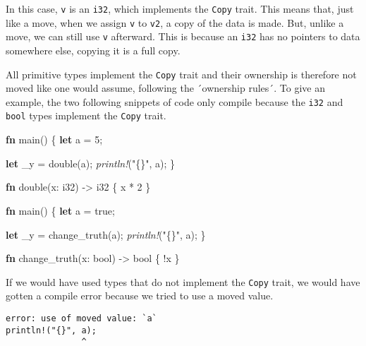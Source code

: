 \documentclass[a4paper,]{book}
\newenvironment{Shaded}{\begin{snugshade}}{\end{snugshade}}
\newcommand{\KeywordTok}[1]{\textcolor[rgb]{0.13,0.29,0.53}{\textbf{{#1}}}}
\newcommand{\DataTypeTok}[1]{\textcolor[rgb]{0.13,0.29,0.53}{{#1}}}
\newcommand{\DecValTok}[1]{\textcolor[rgb]{0.00,0.00,0.81}{{#1}}}
\newcommand{\ConstantTok}[1]{\textcolor[rgb]{0.00,0.00,0.00}{{#1}}}
\newcommand{\StringTok}[1]{\textcolor[rgb]{0.31,0.60,0.02}{{#1}}}
\newcommand{\PreprocessorTok}[1]{\textcolor[rgb]{0.56,0.35,0.01}{\textit{{#1}}}}
\newcommand{\NormalTok}[1]{{#1}}
\begin{document}
In this case, \texttt{v} is an \texttt{i32}, which implements the
\texttt{Copy} trait. This means that, just like a move, when we assign
\texttt{v} to \texttt{v2}, a copy of the data is made. But, unlike a
move, we can still use \texttt{v} afterward. This is because an
\texttt{i32} has no pointers to data somewhere else, copying it is a
full copy.

All primitive types implement the \texttt{Copy} trait and their
ownership is therefore not moved like one would assume, following the
´ownership rules´. To give an example, the two following snippets of
code only compile because the \texttt{i32} and \texttt{bool} types
implement the \texttt{Copy} trait.

\begin{Shaded}
\begin{Highlighting}[]
\KeywordTok{fn} \NormalTok{main() \{}
    \KeywordTok{let} \NormalTok{a = }\DecValTok{5}\NormalTok{;}

    \KeywordTok{let} \NormalTok{_y = double(a);}
    \PreprocessorTok{println!}\NormalTok{(}\StringTok{"\{\}"}\NormalTok{, a);}
\NormalTok{\}}

\KeywordTok{fn} \NormalTok{double(x: }\DataTypeTok{i32}\NormalTok{) -> }\DataTypeTok{i32} \NormalTok{\{}
    \NormalTok{x * }\DecValTok{2}
\NormalTok{\}}
\end{Highlighting}
\end{Shaded}

\begin{Shaded}
\begin{Highlighting}[]
\KeywordTok{fn} \NormalTok{main() \{}
    \KeywordTok{let} \NormalTok{a = }\ConstantTok{true}\NormalTok{;}

    \KeywordTok{let} \NormalTok{_y = change_truth(a);}
    \PreprocessorTok{println!}\NormalTok{(}\StringTok{"\{\}"}\NormalTok{, a);}
\NormalTok{\}}

\KeywordTok{fn} \NormalTok{change_truth(x: }\DataTypeTok{bool}\NormalTok{) -> }\DataTypeTok{bool} \NormalTok{\{}
    \NormalTok{!x}
\NormalTok{\}}
\end{Highlighting}
\end{Shaded}

If we would have used types that do not implement the \texttt{Copy}
trait, we would have gotten a compile error because we tried to use a
moved value.

\begin{verbatim}
error: use of moved value: `a`
println!("{}", a);
               ^
\end{verbatim}
\end{document}
